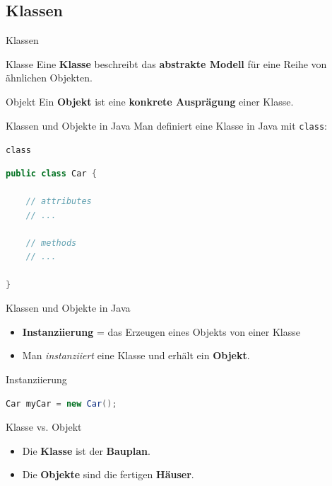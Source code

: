 \documentclass[18pt]{beamer}
\begin{document}
\subsection{Klassen}

\begin{frame}{Klassen}
    \begin{block}{Klasse}
        Eine \textbf{Klasse} beschreibt das \textbf{abstrakte Modell} für eine Reihe von ähnlichen Objekten.
    \end{block}

    \begin{block}{Objekt}
        Ein \textbf{Objekt} ist eine \textbf{konkrete Ausprägung} einer Klasse.
    \end{block}
\end{frame}

\begin{frame}[fragile]{Klassen und Objekte in Java}
    Man definiert eine Klasse in Java mit \texttt{class}:
    \begin{exampleblock}{\texttt{class}}
        \begin{lstlisting}[language=Java]
public class Car {

    // attributes
    // ...

    // methods
    // ...

}
        \end{lstlisting}
    \end{exampleblock}
\end{frame}

\begin{frame}[fragile]{Klassen und Objekte in Java}
    \begin{itemize}
        \item \textbf{Instanziierung} = das Erzeugen eines Objekts von einer Klasse
        \item Man \textit{instanziiert} eine Klasse und erhält ein \textbf{Objekt}.\\
    \end{itemize}

    \begin{exampleblock}{Instanziierung}
        \begin{lstlisting}[language=Java]
Car myCar = new Car();
        \end{lstlisting}
    \end{exampleblock}
\end{frame}

\begin{frame}{Klasse vs. Objekt}
    \begin{itemize}
        \item Die \textbf{Klasse} ist der \textbf{Bauplan}.
        \item Die \textbf{Objekte} sind die fertigen \textbf{Häuser}.
    \end{itemize}
\end{frame}
\end{document}
